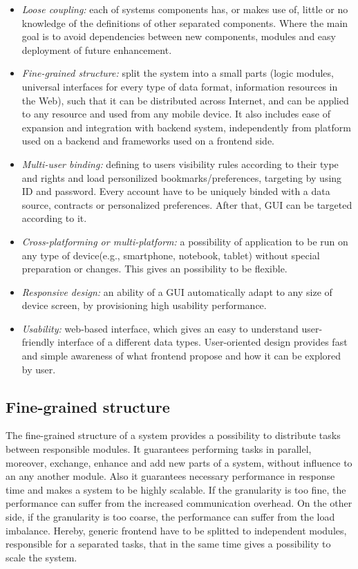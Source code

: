 \begin{itemize}
\item \emph{Loose coupling:} each of systems components has, or makes use of, little or no knowledge of the definitions of other separated components. Where the main goal is to avoid dependencies between new components, modules and easy deployment of future enhancement.
\item \emph{Fine-grained structure:} split the system into a small parts (logic modules, universal interfaces for every type of data format, information resources in the Web), such that it can be distributed across Internet, and can be applied to any resource and used from any mobile device. It also includes ease of expansion and integration with backend system, independently from platform used on a backend and frameworks used on a frontend side.
\item \emph{Multi-user binding:} defining to users visibility rules according to their type and rights and load personilized bookmarks/preferences, targeting by using ID and password. Every account have to be uniquely binded with a data source, contracts or personalized preferences. After that, GUI can be targeted according to it.
\item \emph{Cross-platforming or multi-platform:} a possibility of application to be run on any type of device(e.g., smartphone, notebook, tablet) without special preparation or changes. This gives an possibility to be flexible.
\item \emph{Responsive design:} an ability of a GUI automatically adapt to any size of device screen, by provisioning high usability performance.
\item \emph{Usability:} web-based interface, which gives an easy to understand user-friendly interface of a different data types. User-oriented design provides fast and simple awareness of what frontend propose and how it can be explored by user.
\end{itemize} 

\subsection {Fine-grained structure}
The fine-grained structure of a system provides a possibility to distribute tasks between responsible modules. It guarantees performing tasks in parallel, moreover, exchange, enhance and add new parts of a system, without influence to an any another module. Also it guarantees necessary performance in response time and makes a system to be highly scalable. If the granularity is too fine, the performance can suffer from the increased communication overhead. On the other side, if the granularity is too coarse, the performance can suffer from the load imbalance. Hereby, generic frontend have to be splitted to independent modules, responsible for a separated tasks, that in the same time gives a possibility to scale the system. 

